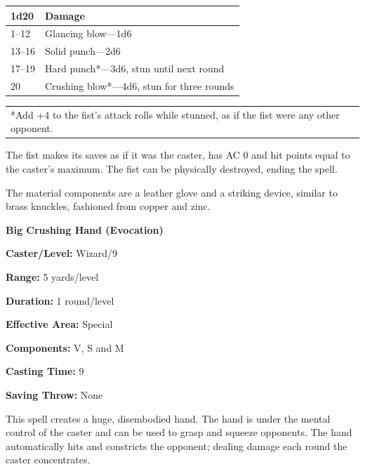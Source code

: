 \begin{multicols}{2}
\noindent\begin{minipage}{\columnwidth}
\noindent
\begin{tabular}{|p{}|p{}|}
\hline
1d20	& Damage \\
\hline\hline
\rowcolor[gray]{.9}1--12	& Glancing blow---1d6 \\
13--16	& Solid punch---2d6 \\
\rowcolor[gray]{.9}17--19	& Hard punch*---3d6, stun until next round \\
20	& Crushing blow*---4d6, stun for three rounds \\
\hline
\end{tabular}
\noindent\begin{tabular}{p{}}
*Add +4 to the fist's attack rolls while stunned, as if the fist were any other opponent. \\
\end{tabular}\vspace{.5em}
\end{minipage}

The fist makes its saves as if it was the caster, has AC 0 and hit points equal to the caster's maximum.  The fist can be physically destroyed, ending the spell.

The material components are a leather glove and a striking device, similar to brass knuckles, fashioned from copper and zinc.

\vspace{1em}

\noindent
\begin{minipage}{\columnwidth}

\noindent \textbf{Big Crushing Hand (Evocation)}

\noindent \textbf{Caster/Level:} Wizard/9

\noindent \textbf{Range:} 5 yards/level

\noindent \textbf{Duration:} 1 round/level

\noindent \textbf{Effective Area:} Special

\noindent \textbf{Components:} V, S and M

\noindent \textbf{Casting Time:} 9

\noindent \textbf{Saving Throw:} None

\end{minipage}

This spell creates a huge, disembodied hand.  The hand is under the mental control of the caster and can be used to grasp and squeeze opponents.  The hand automatically hits and constricts the opponent; dealing damage each round the caster concentrates.


\end{multicols}
